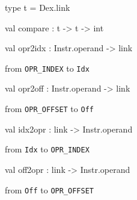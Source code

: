 \documentclass[11pt]{article}
\begin{document}
\begin{ocamldocsigend}


\label{type:Dex.OffKey.t}\begin{ocamldoccode}
type t = Dex.link 
\end{ocamldoccode}


\label{val:Dex.OffKey.compare}\begin{ocamldoccode}
val compare : t -> t -> int
\end{ocamldoccode}
\end{ocamldocsigend}






\label{val:Dex.opr2idx}\begin{ocamldoccode}
val opr2idx : Instr.operand -> link
\end{ocamldoccode}
\begin{ocamldocdescription}
from {\tt{OPR\_INDEX}} to {\tt{Idx}}


\end{ocamldocdescription}




\label{val:Dex.opr2off}\begin{ocamldoccode}
val opr2off : Instr.operand -> link
\end{ocamldoccode}
\begin{ocamldocdescription}
from {\tt{OPR\_OFFSET}} to {\tt{Off}}


\end{ocamldocdescription}




\label{val:Dex.idx2opr}\begin{ocamldoccode}
val idx2opr : link -> Instr.operand
\end{ocamldoccode}
\begin{ocamldocdescription}
from {\tt{Idx}} to {\tt{OPR\_INDEX}}


\end{ocamldocdescription}




\label{val:Dex.off2opr}\begin{ocamldoccode}
val off2opr : link -> Instr.operand
\end{ocamldoccode}
\begin{ocamldocdescription}
from {\tt{Off}} to {\tt{OPR\_OFFSET}}


\end{ocamldocdescription}
\end{document}
